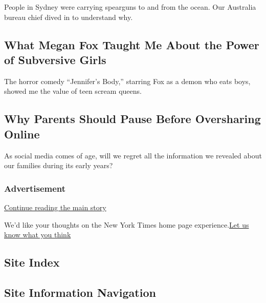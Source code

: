 People in Sydney were carrying spearguns to and from the ocean. Our
Australia bureau chief dived in to understand why.

\href{/2020/08/06/movies/megan-fox-jennifers-body.html}{}

\hypertarget{what-megan-fox-taught-me-about-the-power-of-subversive-girls}{%
\subsection{What Megan Fox Taught Me About the Power of Subversive
Girls}\label{what-megan-fox-taught-me-about-the-power-of-subversive-girls}}

The horror comedy ``Jennifer's Body,'' starring Fox as a demon who eats
boys, showed me the value of teen scream queens.

\href{/2020/08/06/movies/megan-fox-jennifers-body.html}{}

\href{/2020/08/04/well/family/parents-social-media-privacy.html}{}

\hypertarget{why-parents-should-pause-before-oversharing-online}{%
\subsection{Why Parents Should Pause Before Oversharing
Online}\label{why-parents-should-pause-before-oversharing-online}}

As social media comes of age, will we regret all the information we
revealed about our families during its early years?

\href{/2020/08/04/well/family/parents-social-media-privacy.html}{}

\hypertarget{advertisement}{%
\subsubsection{Advertisement}\label{advertisement}}

\protect\hyperlink{after-dfp-ad-mid1-large}{Continue reading the main
story}

We'd like your thoughts on the New York Times home page
experience.\href{http://nyt.qualtrics.com/jfe/form/SV_eFJmKj9v0krSE0l}{Let
us know what you think}

\hypertarget{site-index}{%
\subsection{Site Index}\label{site-index}}

\hypertarget{site-information-navigation}{%
\subsection{Site Information
Navigation}\label{site-information-navigation}}

